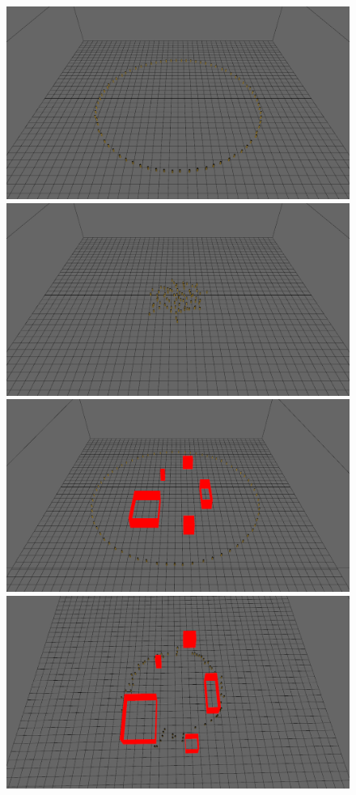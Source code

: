 \documentclass[a4paper,twocolumn]{article}
\begin{document}
\begin{center}
\begin{figure}[t]
\centering
\includegraphics[scale=0.08]{images/RVO_circle.png}
\includegraphics[scale=0.08]{images/RVO_circle2.png}
\includegraphics[scale=0.08]{images/RVO_bounds_circ.png}
\includegraphics[scale=0.08]{images/RVO_bound_circ2.png}

\end{figure}
\end{center}
\end{document}
